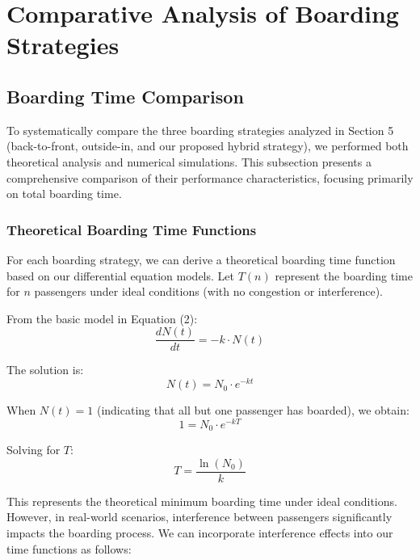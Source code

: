 \section{Comparative Analysis of Boarding Strategies}

\subsection{Boarding Time Comparison}

To systematically compare the three boarding strategies analyzed in Section 5 (back-to-front, outside-in, and our proposed hybrid strategy), we performed both theoretical analysis and numerical simulations. This subsection presents a comprehensive comparison of their performance characteristics, focusing primarily on total boarding time.

\subsubsection{Theoretical Boarding Time Functions}

For each boarding strategy, we can derive a theoretical boarding time function based on our differential equation models. Let $T(n)$ represent the boarding time for $n$ passengers under ideal conditions (with no congestion or interference).

From the basic model in Equation (2):
\begin{equation}
\frac{dN(t)}{dt} = -k \cdot N(t)
\end{equation}

The solution is:
\begin{equation}
N(t) = N_0 \cdot e^{-kt}
\end{equation}

When $N(t) = 1$ (indicating that all but one passenger has boarded), we obtain:
\begin{equation}
1 = N_0 \cdot e^{-kT}
\end{equation}

Solving for $T$:
\begin{equation}
T = \frac{\ln(N_0)}{k}
\end{equation}

This represents the theoretical minimum boarding time under ideal conditions. However, in real-world scenarios, interference between passengers significantly impacts the boarding process. We can incorporate interference effects into our time functions as follows:

